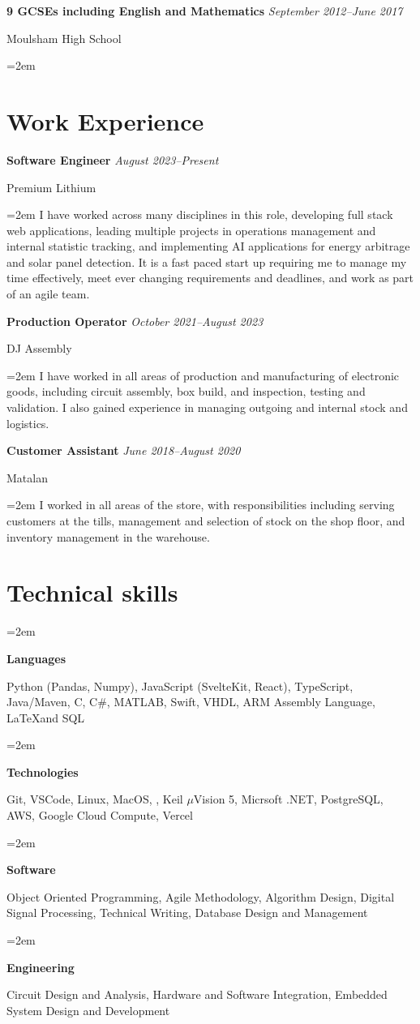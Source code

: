 \documentclass[12pt]{article} %
\newlength{\spacebox}
\newcommand{\skill}[2]{
  \noindent\hangindent=2em\hangafter=0
  \parbox{1.8\spacebox}{%
  \textbf{#1}} %
  {\small #2} \par} %
\newcommand{\education}[4]{
\noindent  \textbf{#1}
  \newline
  \noindent \textit{#2} \par
  \noindent #3 \par
\vspace*{0.5em}
  \noindent\hangindent=2em\hangafter=0 \small #4
\normalsize \par}
\newcommand{\work}[4]{
  \noindent  \textbf{#1}
  \newline
  \noindent \textit{#2} \par
  \noindent #3 \par
\vspace*{0.5em}
  \noindent\hangindent=2em\hangafter=0 \small #4 
\normalsize \par}
\begin{document}
\education{9 GCSEs including English and Mathematics}{September 2012--June 2017}{Moulsham High School}{}

\section*{Work Experience}
\work{Software Engineer}{August 2023--Present}{Premium Lithium}{I have worked across many disciplines in this role, developing full stack web applications, leading multiple projects in operations management and internal statistic tracking, and implementing AI applications for energy arbitrage and solar panel detection. It is a fast paced start up requiring me to manage my time effectively, meet ever changing requirements and deadlines, and work as part of an agile team.}
\newpage
\work{Production Operator}{October 2021--August 2023}{DJ Assembly}{I have worked in all areas of production and manufacturing of electronic goods, including circuit assembly, box build, and inspection, testing and validation. I also gained experience in managing outgoing and internal stock and logistics.}
\work{Customer Assistant}{June 2018--August 2020}{Matalan}{I worked in all areas of the store, with responsibilities including serving customers at the tills, management and selection of stock on the shop floor, and inventory management in the warehouse.}

\section*{Technical skills}

\skill{Languages}{Python (Pandas, Numpy), JavaScript (SvelteKit, React), TypeScript, Java/Maven, C, C$\#$, MATLAB, Swift, VHDL, ARM Assembly Language, \LaTeX and SQL}
\skill{Technologies}{Git, VSCode, Linux, MacOS, , Keil $\mu$Vision 5, Micrsoft .NET, PostgreSQL, AWS, Google Cloud Compute, Vercel}
\skill{Software}{Object Oriented Programming, Agile Methodology, Algorithm Design, Digital Signal Processing, Technical Writing, Database Design and Management}
\skill{Engineering}{Circuit Design and Analysis, Hardware and Software Integration, Embedded System Design and Development}
\end{document}
